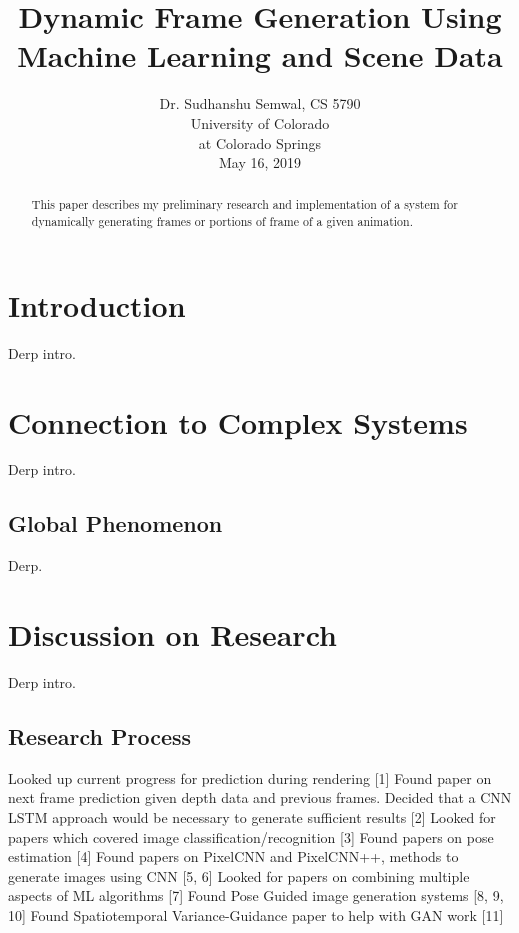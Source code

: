 \documentclass[conference]{IEEEtran}
\begin{document}
\title{Dynamic Frame Generation Using Machine Learning
and Scene Data
}

\author{
Dr. Sudhanshu Semwal, CS 5790\\
University of Colorado\\
at Colorado Springs\\
May 16, 2019}

\maketitle

\onehalfspacing

\begin{abstract}
This paper describes my preliminary research and implementation of a
system for dynamically generating frames or portions of frame
of a given animation.
\end{abstract}

\section{Introduction}
\label{sec:introduction}
Derp intro.

\section{Connection to Complex Systems}
\label{sec:introduction}
Derp intro.

\subsection{Global Phenomenon}
\label{ref:subsection_ref}
Derp.

\section{Discussion on Research}
\label{sec:discussion_on_research}
Derp intro.

\subsection{Research Process}
\label{ref:subsection_ref}
Looked up current progress for prediction during rendering [1]
Found paper on next frame prediction given depth data and previous frames. Decided that a CNN LSTM approach would be necessary to generate sufficient results [2]
Looked for papers which covered image classification/recognition [3]
Found papers on pose estimation [4]
Found papers on PixelCNN and PixelCNN++, methods to generate images using CNN [5, 6]
Looked for papers on combining multiple aspects of ML algorithms [7]
Found Pose Guided image generation systems [8, 9, 10]
Found Spatiotemporal Variance-Guidance paper to help with GAN work [11]
\end{document}
